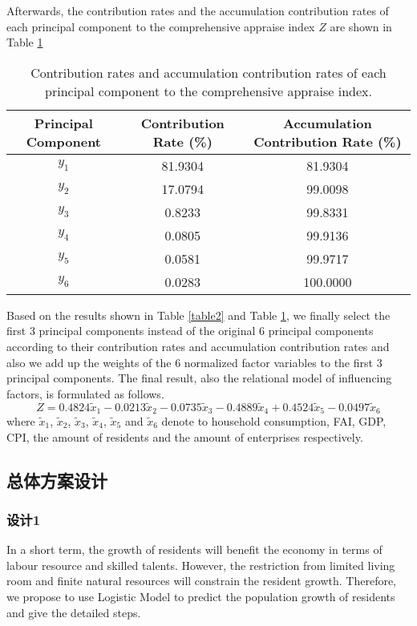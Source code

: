\documentclass{apmcmthesis}
\begin{document}
Afterwards, the contribution rates and the accumulation contribution rates of each principal component to the comprehensive appraise index $Z$ are shown in Table \ref{table3} 
\begin{table}[h]
\centering
\footnotesize
\caption{Contribution rates and accumulation contribution rates of each principal component to the comprehensive appraise index.}
\begin{tabular}{|c|c|c|}
\hline
\textbf{Principal Component}&\textbf{Contribution Rate (\%)}& \textbf{Accumulation Contribution Rate (\%)}\\
\hline
\textbf{$y_1$} & 81.9304 & 81.9304 \\
\hline
\textbf{$y_2$} & 17.0794 & 99.0098 \\
\hline
\textbf{$y_3$} & 0.8233  & 99.8331 \\
\hline
\textbf{$y_4$} & 0.0805   & 99.9136 \\
\hline
\textbf{$y_5$} & 0.0581  & 99.9717 \\
\hline
\textbf{$y_6$} & 0.0283  & 100.0000 \\
\hline
\end{tabular}\label{table3}
\end{table}

Based on the results shown in Table \ref{table2} and Table \ref{table3}, we finally select the first 3 principal components instead of the original 6 principal components according to their contribution rates and accumulation contribution rates and also we add up the weights of the 6 normalized factor variables to the first 3 principal components. The final result, also the relational model of influencing factors, is formulated as follows.
\begin{equation}
Z=0.4824{\tilde{x}}_{1}-0.0213{\tilde{x}}_{2}-0.0735{\tilde{x}}_{3}-0.4889{\tilde{x}}_{4}+0.4524{\tilde{x}}_{5}-0.0497{\tilde{x}}_{6}
\end{equation}
where ${\tilde{x}}_{1}$, ${\tilde{x}}_{2}$, ${\tilde{x}}_{3}$, ${\tilde{x}}_{4}$, ${\tilde{x}}_{5}$ and ${\tilde{x}}_{6}$ denote to household consumption, FAI, GDP, CPI, the amount of residents and the amount of enterprises respectively.


\subsection{总体方案设计}
\subsubsection{设计1}
\hspace{2em}In a short term, the growth of residents will benefit the economy in terms of labour resource and skilled talents. However, the restriction from limited living room and finite natural resources will constrain the resident growth. Therefore, we propose to use Logistic Model to predict the population growth of residents and give the detailed steps.
\end{document}
